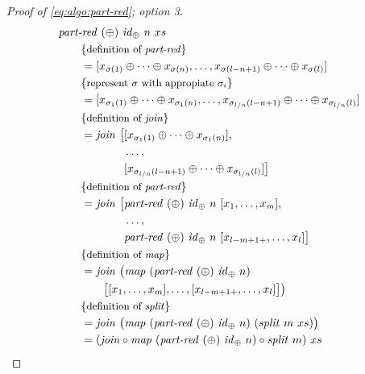 \begin{proof}[Proof of \autoref{eq:algo:part-red}; option 3]
  \begin{align*}
    &\partRed\ (\oplus)\ \id_\oplus\ n\ xs\\
    &\qquad \comment{definition of \partRed}\\
    &\qquad = [x_{\sigma(1)} \oplus \dots \oplus x_{\sigma(n)}, \ldots, x_{\sigma(l-n+1)} \oplus \dots \oplus x_{\sigma(l)}]\\
    &\qquad \comment{represent $\sigma$ with appropiate $\sigma_i$}\\
    &\qquad = [x_{\sigma_1(1)} \oplus \dots \oplus x_{\sigma_1(n)}, \ldots, x_{\sigma_{l/n}(l-n+1)} \oplus \dots \oplus x_{\sigma_{l/n}(l)}]\\
    &\qquad \comment{definition of \join}\\
    &\qquad = \join\
      \begin{aligned}[t]
        \big[&[x_{\sigma_1(1)} \oplus \dots \oplus x_{\sigma_1(n)}],\\
             &\ldots,\\
             &[x_{\sigma_{l/n}(l-n+1)} \oplus \dots \oplus x_{\sigma_{l/n}(l)}]\big]
      \end{aligned}\\
    &\qquad \comment{definition of \partRed}\\
    &\qquad = \join\
      \begin{aligned}[t]
        \big[&\partRed\ (\oplus)\ \id_\oplus\ n\ [x_1, \ldots, x_m],\\
             &\ldots,\\
             &\partRed\ (\oplus)\ \id_\oplus\ n\ [x_{l-m+1+}, \ldots, x_l]\big]
      \end{aligned}\\
    &\qquad \comment{definition of \map}\\
    &\qquad = \join\ \big(\map\ (\partRed\ (\oplus)\ \id_\oplus\ n)\\
    &\qquad\qquad \big[[x_1, \ldots, x_m], \ldots, [x_{l-m+1+}, \ldots, x_l]\big]\big)\\
    &\qquad \comment{definition of \splitN}\\
    &\qquad = \join\ \big(\map\ (\partRed\ (\oplus)\ \id_\oplus\ n)\ (\splitN\ m\ xs)\big)\\
    &\qquad = (\join \circ \map\ (\partRed\ (\oplus)\ \id_\oplus\ n) \circ \splitN\ m)\ xs
  \end{align*}
\end{proof}
